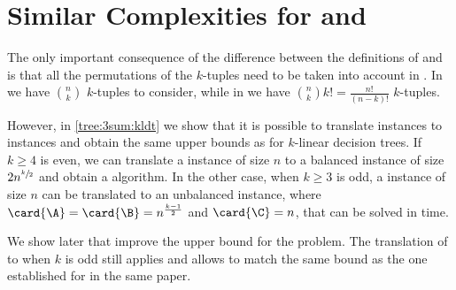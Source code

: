 \section{Similar Complexities for \kSUM and \kLDT}

The only important consequence of the difference between the definitions of
\kSUM and \kLDT is that all the permutations of the $k$-tuples need to be taken
into account in \kLDT. In \kSUM we have $\binom{n}{k}$ $k$-tuples to consider,
while in \kLDT we have $\binom{n}{k} k! = \frac{n!}{(n-k)!}$ $k$-tuples.

However, in \ref{tree:3sum:kldt} we show that it is possible to translate
\kLDT instances to
\kSUM instances and obtain the same upper bounds as \kSUM for $k$-linear
decision trees. If $k \ge 4$ is even, we can translate a \kLDT instance of
size \(n\) to a balanced \twoSUM instance of size \(2n^{\sfrac{k}{2}}\)
and obtain a  algorithm. In the other case, when
$k \ge 3$ is odd, a \kLDT instance of size \(n\) can be translated to an unbalanced \threeSUM instance, where
\(\card{\A} = \card{\B} = n^{\frac{k-1}{2}}\) and \(\card{\C} = n\), that can be solved in
 time.

We show later that \citet*{gronlund:2014} improve the upper bound for the
\threeSUM problem. The translation of \kLDT to \threeSUM when $k$ is
odd still applies
and allows to match the same 
bound as the one established for \threeSUM in the same paper.

